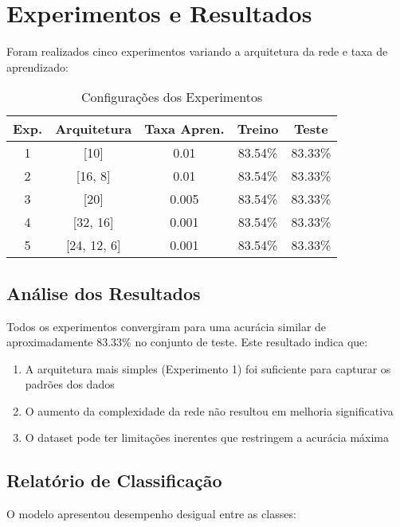 \documentclass[12pt]{article}
\begin{document}
\section{Experimentos e Resultados}

Foram realizados cinco experimentos variando a arquitetura da rede e taxa de aprendizado:

\begin{table}[H]
\centering
\caption{Configurações dos Experimentos}
\label{tab:experimentos}
\begin{tabular}{|c|c|c|c|c|}
\hline
\textbf{Exp.} & \textbf{Arquitetura} & \textbf{Taxa Apren.} & \textbf{Treino} & \textbf{Teste} \\
\hline
1 & [10] & 0.01 & 83.54\% & 83.33\% \\
2 & [16, 8] & 0.01 & 83.54\% & 83.33\% \\
3 & [20] & 0.005 & 83.54\% & 83.33\% \\
4 & [32, 16] & 0.001 & 83.54\% & 83.33\% \\
5 & [24, 12, 6] & 0.001 & 83.54\% & 83.33\% \\
\hline
\end{tabular}
\end{table}

\subsection{Análise dos Resultados}

Todos os experimentos convergiram para uma acurácia similar de aproximadamente 83.33\% no conjunto de teste. Este resultado indica que:

\begin{enumerate}
    \item A arquitetura mais simples (Experimento 1) foi suficiente para capturar os padrões dos dados
    \item O aumento da complexidade da rede não resultou em melhoria significativa
    \item O dataset pode ter limitações inerentes que restringem a acurácia máxima
\end{enumerate}

\subsection{Relatório de Classificação}

O modelo apresentou desempenho desigual entre as classes:
\end{document}
